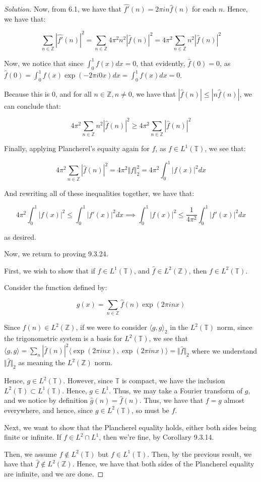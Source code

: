 \documentclass[10pt]{article}
\begin{document}
\begin{proof}[Solution]
Now, from 6.1, we have that $\hat{f'}(n) =  2\pi i n \hat{f}(n)$ for each $n$. Hence, we have that:

$$  \sum_{n \in \mathbb{Z}} | \hat{f'}(n)|^2 =  \sum_{n \in \mathbb{Z}} 4 \pi^2 n^2| \hat{f}(n)|^2 = 4 \pi^2 \sum_{n \in \mathbb{Z}} n^2| \hat{f}(n)|^2$$

Now, we notice that since $\int_0^1 f(x) dx = 0$, that evidently, $\hat{f}(0) = 0$, as $\hat{f}(0) = \int_0^1 f(x) \exp(-2\pi i 0 x) dx = \int_0^1 f(x) dx = 0$.

Because this is 0, and for all $n \in \mathbb{Z}, n \not = 0$, we have that $|\hat{f}(n)| \leq | n \hat{f}(n)|$, we can conclude that:

$$  4 \pi^2 \sum_{n \in \mathbb{Z}} n^2| \hat{f}(n)|^2 \geq 4 \pi^2 \sum_{n \in \mathbb{Z}} | \hat{f}(n) |^2 $$

Finally, applying Plancherel's equaity again for $f$, as $f \in L^1(\mathbb{T})$, we see that:

$$ 4 \pi^2 \sum_{n \in \mathbb{Z}} | \hat{f}(n) |^2  = 4 \pi^2 \Vert f \Vert_2^2 = 4 \pi^2 \int_0^1 |f(x)|^2 dx $$

And rewriting all of these inequalities together, we have that:

$$ 4\pi^2 \int_0^1 |f(x)|^2 \leq \int_0^1 |f'(x)|^2 dx \implies \int_0^1 |f(x)|^2 \leq \frac{1}{4\pi^2} \int_0^1 |f'(x)|^2 dx$$

as desired.

Now, we return to proving 9.3.24.

First, we wish to show that if $f \in L^1(\mathbb{T})$, and $\hat{f} \in L^2(\mathbb{Z})$, then $f \in L^2(\mathbb{T})$.

Consider the function defined by:

$$ g(x) = \sum_{n \in \mathbb{Z}} \hat{f}(n) \exp(2 \pi i n x) $$

Since $\hat{f}(n) \in L^2(\mathbb{Z})$, if we were to consider $\langle g, g \rangle_2$ in the $L^2(\mathbb{T})$ norm, since the trigonometric system is a basis for $L^2(\mathbb{T})$, we see that $\langle g, g \rangle = \sum_n |\hat{f}(n)|^2 \langle \exp(2 \pi i n x), \exp(2\pi i n x) \rangle = \Vert \hat{f} \Vert_2$ where we understand $\Vert \hat{f} \Vert_2$ as meaning the $L^2(\mathbb{Z})$ norm.

Hence, $g \in L^2(\mathbb{T})$. However, since $\mathbb{T}$ is compact, we have the inclusion $L^2(\mathbb{T}) \subset L^1(\mathbb{T})$. Hence, $g \in L^1$. Thus, we may take a Fourier transform of $g$, and we notice by definition $\hat{g}(n) = \hat{f}(n)$. Thus, we have that $f = g$ almost everywhere, and hence, since $g \in L^2(\mathbb{T})$, so must be $f$.

Next, we want to show that the Plancherel equality holds, either both sides being finite or infinite. If $f \in L^2 \cap L^1$, then we're fine, by Corollary 9.3.14.

Then, we assume $f \not \in L^2(\mathbb{T})$ but $f \in L^1(\mathbb{T})$. Then, by the previous result, we have that $\hat{f} \not \in L^2(\mathbb{Z})$. Hence, we have that both sides of the Plancherel equality are infinite, and we are done.




\end{proof}
\end{document}
